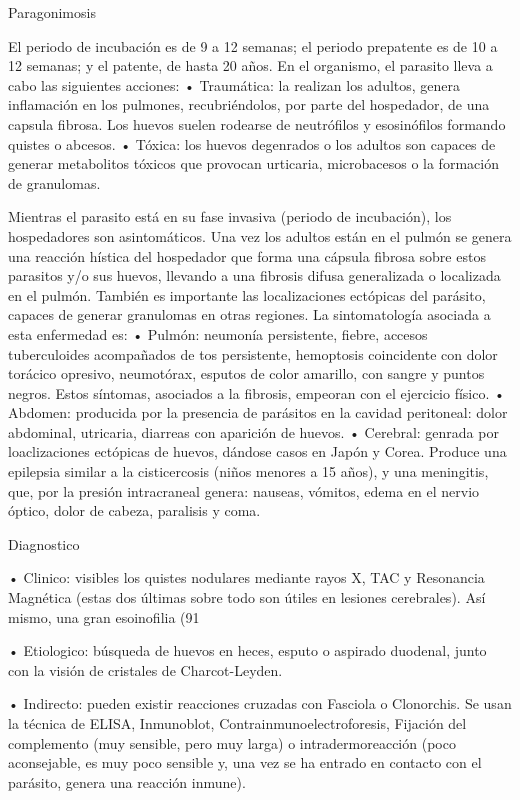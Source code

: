 Paragonimosis

El periodo de incubación es de 9 a 12 semanas; el periodo prepatente es de 10 a 12 semanas; y el patente, de hasta 20 años. En el organismo, el parasito lleva a cabo las siguientes acciones:
• Traumática: la realizan los adultos, genera inflamación en los pulmones, recubriéndolos, por parte del hospedador, de una capsula fibrosa. Los huevos suelen rodearse de neutrófilos y esosinófilos formando quistes o abcesos.
• Tóxica: los huevos degenrados o los adultos son capaces de generar metabolitos tóxicos que provocan urticaria, microbacesos o la formación de granulomas.

Mientras el parasito está en su fase invasiva (periodo de incubación), los hospedadores son asintomáticos. Una vez los adultos están en el pulmón se genera una reacción hística del hospedador que forma una cápsula fibrosa sobre estos parasitos y/o sus huevos, llevando a una fibrosis difusa generalizada o localizada en el pulmón. También es importante las localizaciones ectópicas del parásito, capaces de generar granulomas en otras regiones. La sintomatología asociada a esta enfermedad es:
• Pulmón: neumonía persistente, fiebre, accesos tuberculoides acompañados de tos  persistente, hemoptosis coincidente con dolor torácico opresivo, neumotórax, esputos de color amarillo, con sangre y puntos negros. Estos síntomas, asociados a la fibrosis, empeoran con el ejercicio físico.
• Abdomen: producida por la presencia de parásitos en la cavidad peritoneal: dolor abdominal, utricaria, diarreas con aparición de huevos.
• Cerebral: genrada por loaclizaciones ectópicas de huevos, dándose casos en Japón y Corea. Produce una epilepsia similar a la cisticercosis (niños menores a 15 años), y una meningitis, que, por la presión intracraneal genera: nauseas, vómitos, edema en el nervio óptico, dolor de cabeza, paralisis y coma.

Diagnostico

• Clinico: visibles los quistes nodulares mediante rayos X, TAC y Resonancia Magnética (estas dos últimas sobre todo son útiles en lesiones cerebrales). Así mismo, una gran esoinofilia (91%

• Etiologico: búsqueda de huevos en heces, esputo o aspirado duodenal, junto con la visión de cristales de Charcot-Leyden.

• Indirecto: pueden existir reacciones cruzadas con Fasciola o Clonorchis. Se usan la técnica de ELISA, Inmunoblot, Contrainmunoelectroforesis, Fijación del complemento (muy sensible, pero muy larga) o intradermoreacción (poco aconsejable, es muy poco sensible y, una vez se ha entrado en contacto con el parásito, genera una reacción inmune).
\newpage
